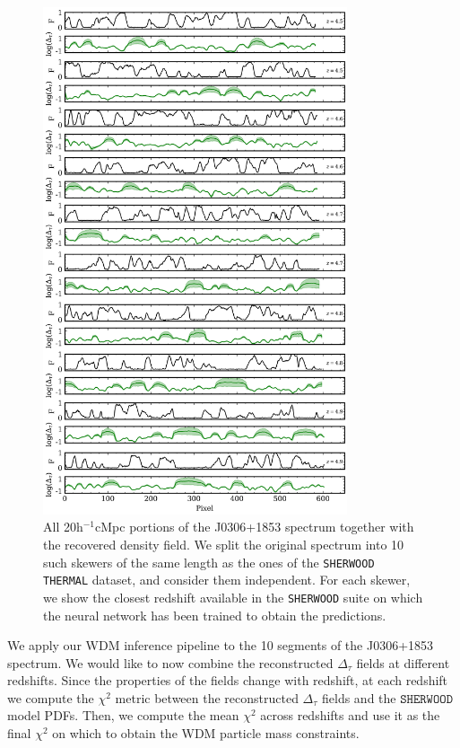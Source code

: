\begin{figure}
    \centering
    \includegraphics[width=0.8\textwidth]{img/ML/GHOST_reconstructions.png}
    \caption{All 20h$^{-1}$cMpc portions of the J0306+1853 spectrum together with the recovered density field. We split the original spectrum into 10 such skewers of the same length as the ones of the \texttt{SHERWOOD THERMAL} dataset, and consider them independent. For each skewer, we show the closest redshift available in the \texttt{SHERWOOD} suite on which the neural network has been trained to obtain the predictions.}
    \label{fig: ghost rec}
\end{figure}

We apply our WDM inference pipeline to the 10 segments of the J0306+1853 spectrum. We would like to now combine the reconstructed $\Delta_\tau$ fields at different redshifts. Since the properties of the fields change with redshift, at each redshift we compute the $\chi^2$ metric between the reconstructed $\Delta_\tau$ fields and the $\texttt{SHERWOOD}$ model PDFs. Then, we compute the mean $\chi^2$ across redshifts and use it as the final $\chi^2$ on which to obtain the WDM particle mass constraints.

